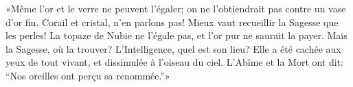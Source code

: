 «Même l’or et le verre ne peuvent l’égaler;
	on ne l’obtiendrait pas contre un vase d’or fin.
Corail et cristal, n’en parlons pas!
	Mieux vaut recueillir la Sagesse que les perles!
La topaze de Nubie ne l’égale pas, et l’or pur ne saurait la payer.
Mais la Sagesse, où la trouver? L’Intelligence, quel est son lieu?
Elle a été cachée aux yeux de tout vivant, et dissimulée à l’oiseau du ciel.
L’Abîme et la Mort ont dit:
	“Nos oreilles ont perçu sa renommée.”»
